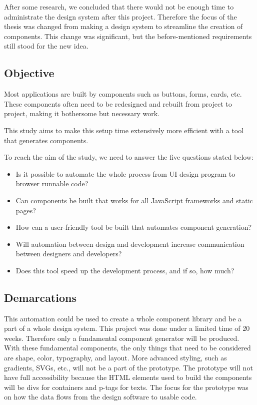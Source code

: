 After some research, we concluded that there would not be enough time to administrate the design system after this project. Therefore the focus of the thesis was changed from making a design system to streamline the creation of components. This change was significant, but the before-mentioned requirements still stood for the new idea. 




\subsection{Objective}
\label{sub:Objective}
Most applications are built by components such as buttons, forms, cards\cite{babichSimpleDesignTips2020}, etc. These components often need to be redesigned and rebuilt from project to project, making it bothersome but necessary work. 

This study aims to make this setup time extensively more efficient with a tool that generates components. 

To reach the aim of the study, we need to answer the five questions stated below:  

\begin{itemize}
  \item Is it possible to automate the whole process from UI design program to browser runnable code? 
  \item Can components be built that works for all JavaScript frameworks and static pages? 
  \item How can a user-friendly tool be built that automates component generation? 
  \item Will automation between design and development increase communication between designers and developers? 
  \item Does this tool speed up the development process, and if so, how much?
\end{itemize}

\subsection{Demarcations}%
\label{sub:Demarcations}
This automation could be used to create a whole component library and be a part of a whole design system. This project was done under a limited time of 20 weeks. Therefore only a fundamental component generator will be produced. With these fundamental components, the only things that need to be considered are shape, color, typography, and layout. More advanced styling, such as gradients, SVGs, etc., will not be a part of the prototype. The prototype will not have full accessibility because the HTML elements used to build the components will be divs for containers and p-tags for texts. The focus for the prototype was on how the data flows from the design software to usable code.



